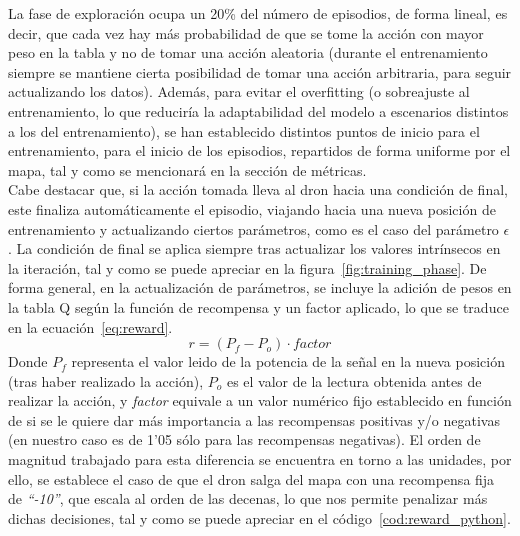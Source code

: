 La fase de exploración ocupa un 20\% del número de episodios, de forma lineal, es decir, que cada vez hay más probabilidad de que se tome la acción con mayor peso en la tabla y no de tomar una acción aleatoria (durante el entrenamiento siempre se mantiene cierta posibilidad de tomar una acción arbitraria, para seguir actualizando los datos). Además, para evitar el overfitting (o sobreajuste al entrenamiento, lo que reduciría la adaptabilidad del modelo a escenarios distintos a los del entrenamiento), se han establecido distintos puntos de inicio para el entrenamiento, para el inicio de los episodios, repartidos de forma uniforme por el mapa, tal y como se mencionará en la sección de métricas.\\

Cabe destacar que, si la acción tomada lleva al dron hacia una condición de final, este finaliza automáticamente el episodio, viajando hacia una nueva posición de entrenamiento y actualizando ciertos parámetros, como es el caso  del parámetro $\epsilon$. La condición de final se aplica siempre tras actualizar los valores intrínsecos en la iteración, tal y como se puede apreciar en la figura~\ref{fig:training_phase}. De forma general, en la actualización de parámetros, se incluye la adición de pesos en la tabla Q según la función de recompensa y un factor aplicado, lo que se traduce en la ecuación~\ref{eq:reward}.
\begin{equation}
    r = (P_f - P_o) \cdot factor
    \label{eq:reward}
\end{equation}
Donde $P_f$ representa el valor leido de la potencia de la señal en la nueva posición (tras haber realizado la acción), $P_o$ es el valor de la lectura obtenida antes de realizar la acción, y \emph{factor} equivale a un valor numérico fijo establecido en función de si se le quiere dar más importancia a las recompensas positivas y/o negativas (en nuestro caso es de 1'05 sólo para las recompensas negativas). El orden de magnitud trabajado para esta diferencia se encuentra en torno a las unidades, por ello, se establece el caso de que el dron salga del mapa con una recompensa fija de \emph{``-10''}, que escala al orden de las decenas, lo que nos permite penalizar más dichas decisiones, tal y como se puede apreciar en el código~\ref{cod:reward_python}.\\

